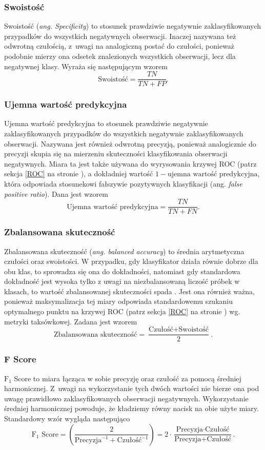 \documentclass[inzynierska]{pwr_wmat_praca_dyplomowa}
\theoremstyle{plain}
\numberwithin{theorem}{chapter}
\theoremstyle{definition}
\numberwithin{theorem}{chapter}
\begin{document}
\subsubsection{Swoistość}
Swoistość (\textit{ang. Specificity}) to stosunek prawdziwie negatywnie zaklasyfikowanych przypadków do wszystkich negatywnych obserwacji. Inaczej nazywana też odwrotną czułością, z~uwagi na analogiczną postać do czułości, ponieważ podobnie mierzy ona odsetek znalezionych wszystkich obserwacji, lecz dla negatywnej klasy. Wyraża się następującym wzorem
$$ \text{Swoistość}= \frac{TN}{TN + FP} \text{.}$$

\subsubsection{Ujemna wartość predykcyjna}
Ujemna wartość predykcyjna to stosunek prawdziwie negatywnie zaklasyfikowanych przypadków do wszystkich negatywnie zaklasyfikowanych obserwacji. Nazywana jest również odwrotną precyzją, ponieważ analogicznie do precyzji skupia się na mierzeniu skuteczności klasyfikowania obserwacji negatywnych. Miara ta jest także używana do wyrysowania krzywej ROC (patrz sekcja \ref{ROC} na stronie \pageref{ROC}), a dokładniej wartość $1- \text{ujemna wartość predykcyjna}$, która odpowiada stosunekowi fałszywie pozytywnych klasyfikacji (ang. \textit{false positive ratio}). Dana jest wzorem
$$ \text{Ujemna wartość predykcyjna}= \frac{TN}{TN + FN} \text{.}$$

\subsubsection{Zbalansowana skuteczność} 
Zbalansowana skuteczność (\textit{ang. balanced accuracy}) to średnia arytmetyczna czułości oraz swoistości. W przypadku, gdy klasyfikator działa równie dobrze dla obu klas, to sprowadza się ona do dokładności, natomiast gdy standardowa dokładność jest wysoka tylko z uwagi na niezbalansowaną liczość próbek w klasach, to wartość zbalansowanej skuteczności spada \cite{balanced_accuracy}. Jest ona również ważna, ponieważ maksymalizacja tej miary odpowiada standardowemu szukaniu optymalnego punktu na krzywej ROC (patrz sekcja \ref{ROC} na stronie \pageref{ROC}) wg. metryki taksówkowej. Zadana jest wzorem
$$ \text{Zbalansowana skuteczność}= \frac{\text{Czułość} + \text{Swoistość}}{2} \text{.}$$

\subsubsection{F Score}
$\text{F}_1$ Score to miara łącząca w sobie precyzję oraz czułość za pomocą średniej harmonicznej. Z~uwagi na wykorzystanie tych dwóch wartości nie bierze ona pod uwagę prawidłowo zaklasyfikowanych obserwacji negatywnych. Wykorzystanie średniej harmonicznej powoduje, że kładziemy równy nacisk na obie użyte miary. Standardowy wzór wygląda następująco
$$ \text{F}_1 \text{ Score} = \left(\frac{2}{\text{Precyzja}^{-1} + \text{Czułość}^{-1}}\right) = 2 \cdot \frac{\text{Precyzja} \cdot \text{Czułość}}{\text{Precyzja} + \text{Czułość}} \text{.}$$
\end{document}
